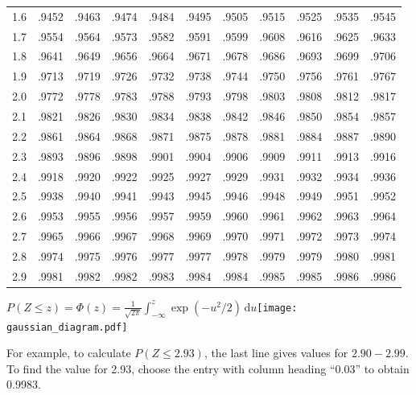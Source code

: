 \documentclass[a4paper]{article}
\begin{document}
\begin{table}[ht]
\begin{tabular}{rllllllllll}
  1.6 & .9452 & .9463 & .9474 & .9484 & .9495 & .9505 & .9515 & .9525 & .9535 & .9545 \\
  1.7 & .9554 & .9564 & .9573 & .9582 & .9591 & .9599 & .9608 & .9616 & .9625 & .9633 \\ 
  1.8 & .9641 & .9649 & .9656 & .9664 & .9671 & .9678 & .9686 & .9693 & .9699 & .9706 \\ 
  1.9 & .9713 & .9719 & .9726 & .9732 & .9738 & .9744 & .9750 & .9756 & .9761 & .9767 \\ 
  2.0 & .9772 & .9778 & .9783 & .9788 & .9793 & .9798 & .9803 & .9808 & .9812 & .9817 \\[3mm]
  2.1 & .9821 & .9826 & .9830 & .9834 & .9838 & .9842 & .9846 & .9850 & .9854 & .9857 \\ 
  2.2 & .9861 & .9864 & .9868 & .9871 & .9875 & .9878 & .9881 & .9884 & .9887 & .9890 \\ 
  2.3 & .9893 & .9896 & .9898 & .9901 & .9904 & .9906 & .9909 & .9911 & .9913 & .9916 \\ 
  2.4 & .9918 & .9920 & .9922 & .9925 & .9927 & .9929 & .9931 & .9932 & .9934 & .9936 \\ 
  2.5 & .9938 & .9940 & .9941 & .9943 & .9945 & .9946 & .9948 & .9949 & .9951 & .9952 \\[3mm] 
  2.6 & .9953 & .9955 & .9956 & .9957 & .9959 & .9960 & .9961 & .9962 & .9963 & .9964 \\ 
  2.7 & .9965 & .9966 & .9967 & .9968 & .9969 & .9970 & .9971 & .9972 & .9973 & .9974 \\ 
  2.8 & .9974 & .9975 & .9976 & .9977 & .9977 & .9978 & .9979 & .9979 & .9980 & .9981 \\ 
  2.9 & .9981 & .9982 & .9982 & .9983 & .9984 & .9984 & .9985 & .9985 & .9986 & .9986 \\ 
   \hline
\end{tabular}
\end{table}

\noindent
\(\displaystyle P(Z\leqslant z)=\Phi(z)=\frac{1}{\sqrt{2\pi}}\int_{-\infty}^z\exp\left(-u^2/2\right)\,\mathrm{d}u\)\hfill\hbox{\texttt{[image: gaussian\_diagram.pdf]}}

\noindent For example, to calculate \(P(Z\leqslant 2.93)\), the last
line gives values for \(2.90-2.99\).  To find the value for 2.93,
choose the entry with column heading ``0.03'' to obtain 0.9983.

\end{document}
